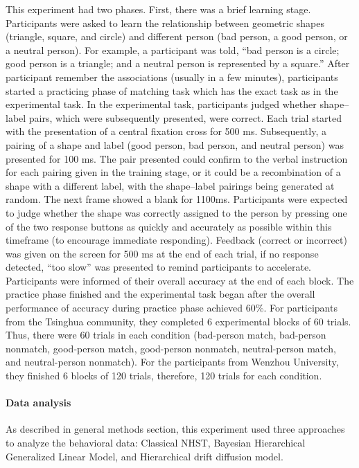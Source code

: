 \documentclass[
  english,
  man]{apa6}
\let\oldparagraph\paragraph
\renewcommand{\paragraph}[1]{\oldparagraph{#1}\mbox{}}
\begin{document}
This experiment had two phases. First, there was a brief learning stage. Participants were asked to learn the relationship between geometric shapes (triangle, square, and circle) and different person (bad person, a good person, or a neutral person). For example, a participant was told, \enquote{bad person is a circle; good person is a triangle; and a neutral person is represented by a square.} After participant remember the associations (usually in a few minutes), participants started a practicing phase of matching task which has the exact task as in the experimental task.
In the experimental task, participants judged whether shape--label pairs, which were subsequently presented, were correct. Each trial started with the presentation of a central fixation cross for 500 ms. Subsequently, a pairing of a shape and label (good person, bad person, and neutral person) was presented for 100 ms. The pair presented could confirm to the verbal instruction for each pairing given in the training stage, or it could be a recombination of a shape with a different label, with the shape--label pairings being generated at random. The next frame showed a blank for 1100ms. Participants were expected to judge whether the shape was correctly assigned to the person by pressing one of the two response buttons as quickly and accurately as possible within this timeframe (to encourage immediate responding). Feedback (correct or incorrect) was given on the screen for 500 ms at the end of each trial, if no response detected, \enquote{too slow} was presented to remind participants to accelerate. Participants were informed of their overall accuracy at the end of each block. The practice phase finished and the experimental task began after the overall performance of accuracy during practice phase achieved 60\%.
For participants from the Tsinghua community, they completed 6 experimental blocks of 60 trials. Thus, there were 60 trials in each condition (bad-person match, bad-person nonmatch, good-person match, good-person nonmatch, neutral-person match, and neutral-person nonmatch). For the participants from Wenzhou University, they finished 6 blocks of 120 trials, therefore, 120 trials for each condition.

\hypertarget{data-analysis-1}{%
\paragraph{Data analysis}\label{data-analysis-1}}

As described in general methods section, this experiment used three approaches to analyze the behavioral data: Classical NHST, Bayesian Hierarchical Generalized Linear Model, and Hierarchical drift diffusion model.
\end{document}
